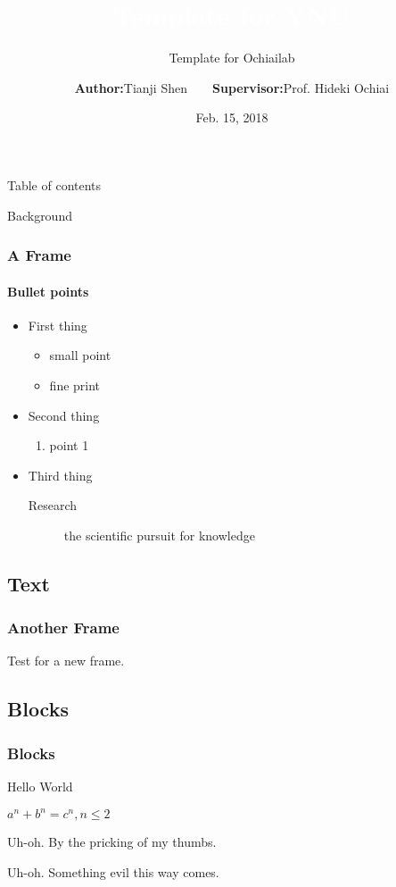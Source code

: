 \documentclass{beamer}
\title{\large \textcolor{white}{Template for YNU}}
\subtitle{Template for Ochiailab}
\author{{\bf Author:}Tianji Shen~~~~{\bf Supervisor:}Prof. Hideki Ochiai}
\date{Feb. 15, 2018}
\institute{Dept. of Electrical and Computing Engineering\\
Yokohama National University}
\begin{document}
\begin{frame}[plain,t]
\titlepage
\end{frame}

\begin{frame}{Table of contents}
  \tableofcontents
\end{frame}



\begin{frame}{Background}
 \frametitle{A Frame}
 \framesubtitle{Bullet points}
 \begin{itemize}
  \item First thing
        \begin{itemize}
         \item small point
         \item fine print
        \end{itemize}
  \item Second thing
        \begin{enumerate}
         \item point 1
        \end{enumerate}
  \item Third thing
        \begin{description}
         \item[Research] the scientific pursuit for knowledge
        \end{description}
 \end{itemize}
\end{frame}

\subsection{Text}
\begin{frame}
\frametitle{Another Frame}
 Test for a new frame.
 \end{frame}

 \subsection{Blocks}
 \begin{frame}
 \frametitle{Blocks}
 \begin{definition}[Greetings]
 Hello World
 \end{definition}

  \begin{theorem}
   $a^n + b^n = c^n, n \leq 2$
  \end{theorem}

  \begin{alertblock}{Uh-oh.}
   By the pricking of my thumbs.
  \end{alertblock}

  \begin{exampleblock}{Uh-oh.}
   Something evil this way comes.
  \end{exampleblock}

 \end{frame}

\ThankYouFrame




\end{document}
